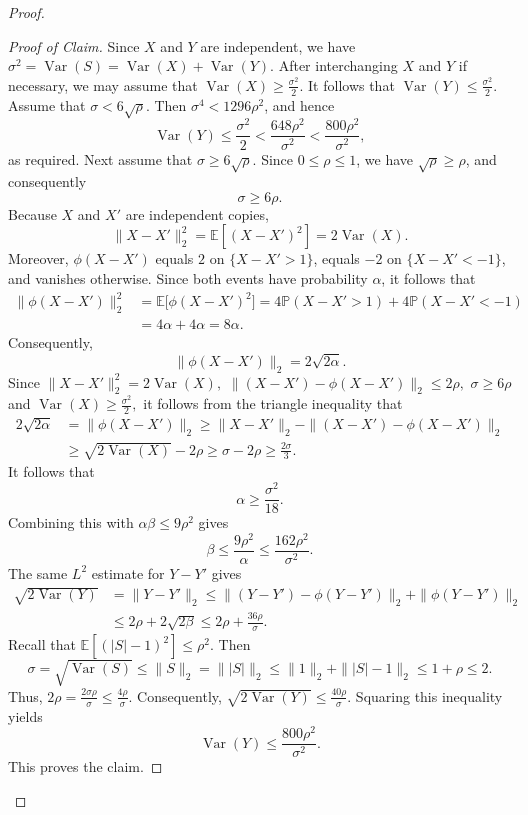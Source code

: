 \documentclass[11pt]{article}
\numberwithin{equation}{section}
\theoremstyle{definition}
\theoremstyle{remark}
\begin{document}
\begin{proof}
\begin{proof}[Proof of Claim]
Since $X$ and $Y$ are independent, we have
$
\sigma^2=\operatorname{Var}(S)
=\operatorname{Var}(X)+\operatorname{Var}(Y).
$
After interchanging $X$ and $Y$ if necessary, we may assume that
$
\operatorname{Var}(X)\geq\frac{\sigma^2}{2}.
$
It follows that
$
\operatorname{Var}(Y)\leq\frac{\sigma^2}{2}.
$
Assume that $\sigma<6\sqrt{\rho}$. Then
$\sigma^4<1296\rho^2$, and hence
$$
\operatorname{Var}(Y)
\leq\frac{\sigma^2}{2}
<\frac{648\rho^2}{\sigma^2}
<\frac{800\rho^2}{\sigma^2},
$$
as required.
Next assume that $\sigma\geq6\sqrt{\rho}$. Since
$0\leq\rho\leq1$, we have $\sqrt{\rho}\geq\rho$, and consequently
$$
\sigma\geq6\rho.
$$
Because $X$ and $X'$ are independent copies,
$$
\|X-X'\|_2^2
=\mathbb E[(X-X')^2]
=2\operatorname{Var}(X).
$$
Moreover, $\phi(X-X')$ equals $2$ on $\{X-X'>1\}$, equals $-2$ on
$\{X-X'<-1\}$, and vanishes otherwise. Since both events have probability $\alpha$, it follows that
$$
\begin{aligned}
\|\phi(X-X')\|_2^2
&=\mathbb E\bigl[\phi(X-X')^2\bigr]=4\mathbb P(X-X'>1)
 +4\mathbb P(X-X'<-1)\\
&=4\alpha+4\alpha=8\alpha.
\end{aligned}
$$
Consequently,
$$
\|\phi(X-X')\|_2=2\sqrt{2\alpha}.
$$
Since $
\|X-X'\|_2^2
=2\operatorname{Var}(X),
$ 
$
\|(X-X')-\phi(X-X')\|_2\leq2\rho,
$
$\sigma\geq6\rho$
and $\operatorname{Var}(X)\geq\frac{\sigma^2}{2},$
it follows from the triangle inequality that
$$
\begin{aligned}
2\sqrt{2\alpha}
&=\|\phi(X-X')\|_2\geq\|X-X'\|_2
-\|(X-X')-\phi(X-X')\|_2\\
&\geq\sqrt{2\operatorname{Var}(X)}-2\rho\geq\sigma-2\rho\geq\frac{2\sigma}{3}.
\end{aligned}
$$
It follows that
$$
\alpha\geq\frac{\sigma^2}{18}.
$$
Combining this with $\alpha\beta\leq9\rho^2$ gives
$$
\beta\leq\frac{9\rho^2}{\alpha}
\leq\frac{162\rho^2}{\sigma^2}.
$$
The same $L^2$ estimate for $Y-Y'$ gives
$$
\begin{aligned}
\sqrt{2\operatorname{Var}(Y)}
&=\|Y-Y'\|_2\leq
\|(Y-Y')-\phi(Y-Y')\|_2
+\|\phi(Y-Y')\|_2\\
&\leq2\rho+2\sqrt{2\beta}\leq2\rho+\frac{36\rho}{\sigma}.
\end{aligned}
$$
Recall that $\mathbb E[(|S|-1)^2]\leq \rho^2$.
Then
$$
\sigma
=\sqrt{\operatorname{Var}(S)}
\leq\|S\|_2=\||S|\|_2\leq\|1\|_2+\||S|-1\|_2\leq1+\rho\leq2.
$$
Thus,
$
2\rho=\frac{2\sigma\rho}{\sigma}
\leq\frac{4\rho}{\sigma}.
$
Consequently,
$
\sqrt{2\operatorname{Var}(Y)}
\leq\frac{40\rho}{\sigma}.
$
Squaring this inequality yields
$$
\operatorname{Var}(Y)
\leq\frac{800\rho^2}{\sigma^2}.
$$
This proves the  claim.
\end{proof}



\end{proof}
\end{document}
